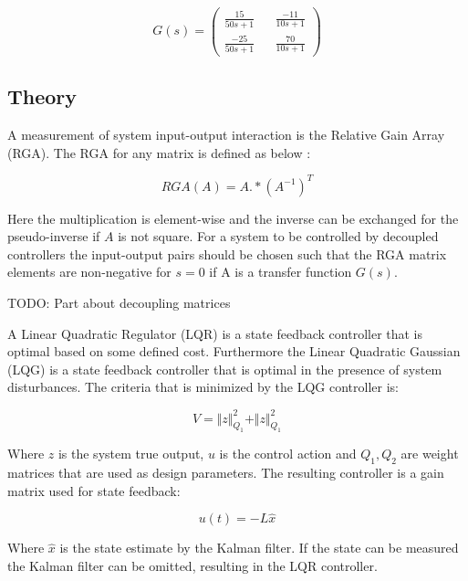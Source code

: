 \documentclass[a4paper, titlepage]{article}
\begin{document}
\begin{equation}
G(s) = 
\begin{pmatrix}
\frac{15}{50s + 1} && \frac{-11}{10s + 1} \\[6pt]
\frac{-25}{50s + 1} && \frac{70}{10s + 1}
\end{pmatrix}
\end{equation}

\subsection{Theory}

A measurement of system input-output interaction is the Relative Gain Array (RGA).
The RGA for any matrix is defined as below \citep[~p.219]{glad00}:

\begin{equation}
RGA(A) = A.*(A^{-1})^T
\end{equation}

Here the multiplication is element-wise and the inverse can be exchanged for the pseudo-inverse if $A$ is not square.
For a system to be controlled by decoupled controllers the input-output pairs should be chosen such that the RGA matrix elements are non-negative for $s=0$ if A is a transfer function $G(s)$.

TODO: Part about decoupling matrices

A Linear Quadratic Regulator (LQR) is a state feedback controller that is optimal based on some defined cost.
Furthermore the Linear Quadratic Gaussian (LQG) is a state feedback controller that is optimal in the presence of system disturbances.
The criteria that is minimized by the LQG controller is:

\begin{equation}
V = \Vert z \Vert^2_{Q_1} + \Vert z \Vert^2_{Q_1}
\end{equation}

Where $z$ is the system true output, $u$ is the control action and $Q_1, Q_2$ are weight matrices that are used as design parameters.
The resulting controller is a gain matrix used for state feedback:

\begin{equation}
u(t) = -L\hat{x}
\end{equation}

Where $\hat{x}$ is the state estimate by the Kalman filter.
If the state can be measured the Kalman filter can be omitted, resulting in the LQR controller.
\citep[~p.242-247]{glad00}
\end{document}

